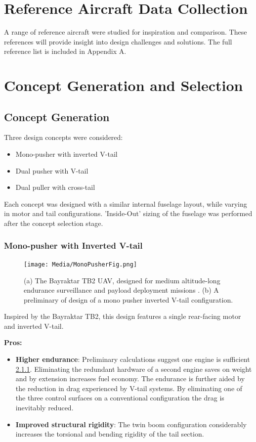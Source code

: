 \documentclass[12pt]{article}
\begin{document}
	\section{Reference Aircraft Data Collection}
	A range of reference aircraft were studied for inspiration and comparison. These references will provide insight into design challenges and solutions. The full reference list is included in Appendix A.
	
	\section{Concept Generation and Selection}
	\subsection{Concept Generation}
	Three design concepts were considered:
	
	\begin{itemize}
		\item Mono-pusher with inverted V-tail
		\item Dual pusher with V-tail
		\item Dual puller with cross-tail
	\end{itemize}
	
	Each concept was designed with a similar internal fuselage layout, while varying in motor and tail configurations. 'Inside-Out' sizing of the fuselage was performed after the concept selection stage.
	
	\newpage
	
	\subsubsection{Mono-pusher with Inverted V-tail}
	\begin{figure}[h!]
		\centering
		\texttt{[image: Media/MonoPusherFig.png]} %
		\caption{(a) The Bayraktar TB2 UAV, designed for medium altitude-long endurance surveillance and payload deployment missions \cite{}. (b) A preliminary of design of a mono pusher inverted V-tail configuration.}
	\end{figure}
	Inspired by the Bayraktar TB2, this design features a single rear-facing motor and inverted V-tail.
	
	\textbf{Pros:}
	\begin{itemize}
		\item \textbf{Higher endurance}: Preliminary calculations suggest one engine is sufficient \ref{}. Eliminating the redundant hardware of a second engine saves on weight and by extension increases fuel economy. The endurance is further aided by the reduction in drag experienced by V-tail systems. By eliminating one of the three control surfaces on a conventional configuration the drag is inevitably reduced. 
		\item \textbf{Improved structural rigidity}: The twin boom configuration considerably increases the torsional and bending rigidity of the tail section.
	\end{itemize}
	
\end{document}
